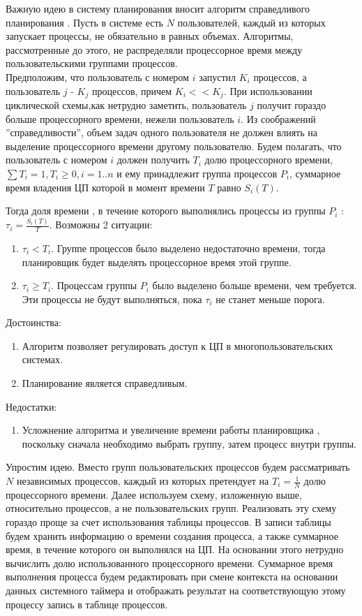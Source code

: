 \label{int:fair}
Важную идею в систему планирования вносит алгоритм справедливого планирования \cite{tanenbaum} . Пусть в системе есть $N$ пользователей, каждый из которых запускает процессы, не обязательно в равных объемах. Алгоритмы, рассмотренные до этого, не распределяли процессорное время между пользовательскими группами процессов.\\
Предположим, что пользователь с номером $i$ запустил $K_i$ процессов, а пользователь $j$ - $K_j$ процессов, причем $K_i << K_j$. При использовании циклической схемы,как нетрудно заметить, пользователь $j$ получит гораздо больше процессорного времени, нежели пользователь $i$. Из соображений ''справедливости'', объем задач одного пользователя не должен влиять на выделение процессорного времени другому пользователю. Будем полагать, что пользователь с номером $i$ должен получить $T_i$ долю процессорного времени, $\sum T_i = 1, T_i \geq 0, i = 1..n$ и ему принадлежит группа процессов $P_i$, суммарное время владения ЦП которой в момент времени $T$ равно $S_i(T)$.

Тогда доля времени , в течение которого выполнялись процессы из группы $P_i$ : $\tau_i = \frac{S_i(T)}{T}$. Возможны 2 ситуации:
\begin{enumerate}[label=---]
\item $\tau_i < T_i$. Группе процессов было выделено недостаточно времени, тогда планировщик  будет выделять процессорное время этой группе.
\item $\tau_i \geq T_i$. Процессам группы $P_i$ было выделено больше времени, чем требуется. Эти процессы не будут выполняться, пока $\tau_i$ не станет меньше порога.
\end{enumerate}  

Достоинства:
\begin{enumerate}[label=---]
\item Алгоритм позволяет регулировать доступ к ЦП в многопользовательских системах.
\item Планирование является справедливым.
\end{enumerate}

Недостатки:
\begin{enumerate}[label=---]
\item Усложнение алгоритма и увеличение времени работы планировщика , поскольку сначала необходимо выбрать группу, затем процесс внутри группы.
\end{enumerate}

Упростим идею. Вместо групп пользовательских процессов будем рассматривать $N$ независимых процессов, каждый из которых претендует на $T_i = \frac{1}{N}$ долю процессорного времени. Далее используем схему, изложенную выше, относительно процессов, а не пользовательских групп. Реализовать эту схему гораздо проще за счет использования таблицы процессов. В записи таблицы будем хранить информацию о времени создания процесса, а также суммарное время, в течение которого он выполнялся на ЦП. На основании этого нетрудно вычислить долю использованного процессорного времени. Суммарное время выполнения процесса будем редактировать при смене контекста на основании данных системного таймера и отображать результат на соответствующую этому процессу запись в таблице процессов. 